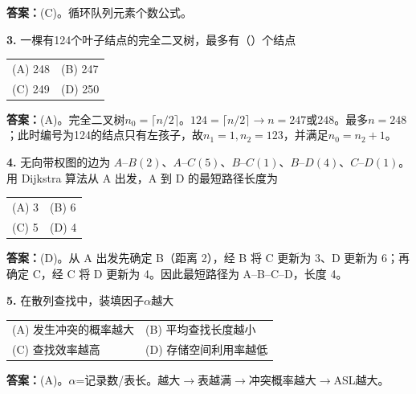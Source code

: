 \ifshowsolutions\par\noindent\textbf{答案：}(C)。循环队列元素个数公式。\else \answerarea \fi

\vspace{6pt}

\noindent\textbf{3.} 一棵有124个叶子结点的完全二叉树，最多有（\quad）个结点
\begin{center}
\begin{tabular}{ll}
(A) 248 & (B) 247 \\[6pt]
(C) 249 & (D) 250
\end{tabular}
\end{center}

\ifshowsolutions\par\noindent\textbf{答案：}(A)。完全二叉树$n_0=\lceil n/2\rceil$。$124=\lceil n/2\rceil\to n=247$或$248$。最多$n=248$；此时编号为124的结点只有左孩子，故$n_1=1,n_2=123$，并满足$n_0=n_2+1$。\else \answerarea \fi

\vspace{6pt}

\noindent\textbf{4.} 无向带权图的边为 $A$--$B(2)$、$A$--$C(5)$、$B$--$C(1)$、$B$--$D(4)$、$C$--$D(1)$。用 Dijkstra 算法从 A 出发，A 到 D 的最短路径长度为
\begin{center}
\begin{tabular}{ll}
(A) 3 & (B) 6 \\[6pt]
(C) 5 & (D) 4
\end{tabular}
\end{center}

\ifshowsolutions\par\noindent\textbf{答案：}(D)。从 A 出发先确定 B（距离 2），经 B 将 C 更新为 3、D 更新为 6；再确定 C，经 C 将 D 更新为 4。因此最短路径为 A--B--C--D，长度 4。\else \answerarea \fi

\vspace{6pt}

\noindent\textbf{5.} 在散列查找中，装填因子$\alpha$越大
\begin{center}
\begin{tabular}{ll}
(A) 发生冲突的概率越大 & (B) 平均查找长度越小 \\[6pt]
(C) 查找效率越高 & (D) 存储空间利用率越低
\end{tabular}
\end{center}

\ifshowsolutions\par\noindent\textbf{答案：}(A)。$\alpha$=记录数/表长。越大$\to$表越满$\to$冲突概率越大$\to$ASL越大。\else \answerarea \fi

